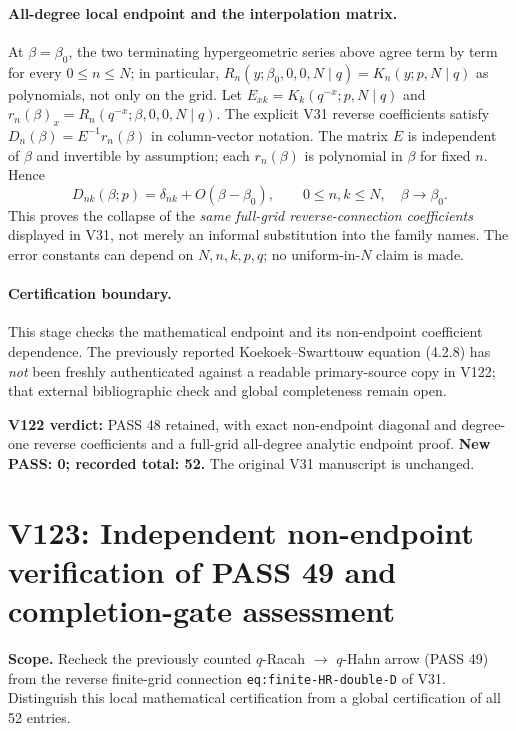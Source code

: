 \documentclass[11pt]{article}
\begin{document}
\paragraph{All-degree local endpoint and the interpolation matrix.} At $\beta=\beta_0$, the two terminating hypergeometric series above agree term by term for every $0\le n\le N$; in particular, $R_n(y;\beta_0,0,0,N\mid q)=K_n(y;p,N\mid q)$ as polynomials, not only on the grid. Let $E_{xk}=K_k(q^{-x};p,N\mid q)$ and $r_n(\beta)_x=R_n(q^{-x};\beta,0,0,N\mid q)$. The explicit V31 reverse coefficients satisfy $D_n(\beta)=E^{-1}r_n(\beta)$ in column-vector notation. The matrix $E$ is independent of $\beta$ and invertible by assumption; each $r_n(\beta)$ is polynomial in $\beta$ for fixed $n$. Hence
\begin{equation}\label{eq:v122-endpoint}
 \boxed{D_{nk}(\beta;p)=\delta_{nk}+O(\beta-\beta_0),\qquad 0\le n,k\le N,\quad \beta\to\beta_0.}
\end{equation}
This proves the collapse of the \emph{same full-grid reverse-connection coefficients} displayed in V31, not merely an informal substitution into the family names. The error constants can depend on $N,n,k,p,q$; no uniform-in-$N$ claim is made.

\paragraph{Certification boundary.} This stage checks the mathematical endpoint and its non-endpoint coefficient dependence. The previously reported Koekoek--Swarttouw equation (4.2.8) has \emph{not} been freshly authenticated against a readable primary-source copy in V122; that external bibliographic check and global completeness remain open.

\noindent\textbf{V122 verdict:} PASS 48 retained, with exact non-endpoint diagonal and degree-one reverse coefficients and a full-grid all-degree analytic endpoint proof. \textbf{New PASS: 0; recorded total: 52.} The original V31 manuscript is unchanged.



\clearpage
\section{V123: Independent non-endpoint verification of PASS 49 and completion-gate assessment}
\noindent\textbf{Scope.} Recheck the previously counted $q$-Racah $\to$ $q$-Hahn arrow (PASS 49) from the reverse finite-grid connection \texttt{eq:finite-HR-double-D} of V31. Distinguish this local mathematical certification from a global certification of all 52 entries.
\end{document}
